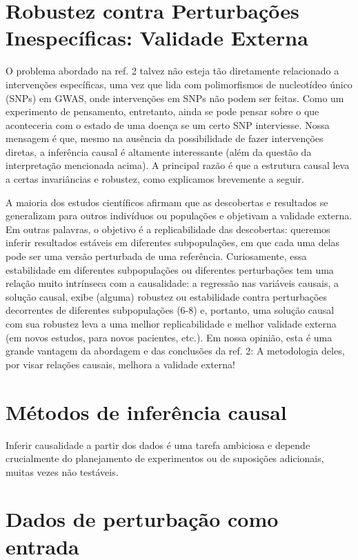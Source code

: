 \section*{Robustez contra Perturbações Inespecíficas: Validade Externa}

    O problema abordado na ref. 2 talvez não esteja tão diretamente relacionado a intervenções específicas, uma vez que lida com polimorfismos de nucleotídeo único (SNPs) em GWAS, onde intervenções em SNPs não podem ser feitas. Como um experimento de pensamento, entretanto, ainda se pode pensar sobre o que aconteceria com o estado de uma doença se um certo SNP interviesse. Nossa mensagem é que, mesmo na ausência da possibilidade de fazer intervenções diretas, a inferência causal é altamente interessante (além da questão da interpretação mencionada acima). A principal razão é que a estrutura causal leva a certas invariâncias e robustez, como explicamos brevemente a seguir.

    A maioria dos estudos científicos afirmam que as descobertas e resultados se generalizam para outros indivíduos ou populações e objetivam a validade externa. Em outras palavras, o objetivo é a replicabilidade das descobertas: queremos inferir resultados estáveis em diferentes subpopulações, em que cada uma delas pode ser uma versão perturbada de uma referência. Curiosamente, essa estabilidade em diferentes subpopulações ou diferentes perturbações tem uma relação muito intrínseca com a causalidade: a regressão nas variáveis causais, a solução causal, exibe (alguma) robustez ou estabilidade contra perturbações decorrentes de diferentes subpopulações (6-8) e, portanto, uma solução causal com sua robustez leva a uma melhor replicabilidade e melhor validade externa (em novos estudos, para novos pacientes, etc.). Em nossa opinião, esta é uma grande vantagem da abordagem e das conclusões da ref. 2: A metodologia deles, por visar relações causais, melhora a validade externa!

\section*{Métodos de inferência causal}

    Inferir causalidade a partir dos dados é uma tarefa ambiciosa e depende crucialmente do planejamento de experimentos ou de suposições adicionais, muitas vezes não testáveis.

\section*{Dados de perturbação como entrada}

